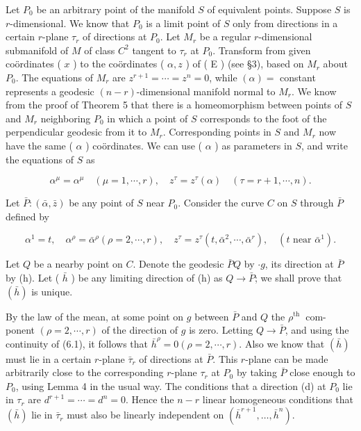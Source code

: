 \documentclass[10pt]{article}
\begin{document}
Let $P_{0}$ be an arbitrary point of the manifold $S$ of equivalent points. Suppose $S$ is $r$-dimensional. We know that $P_{0}$ is a limit point of $S$ only from directions in a certain $r$-plane $\tau_{r}$ of directions at $P_{0}$. Let $M_{r}$ be a regular $r$-dimensional submanifold of $M$ of class $C^{2}$ tangent to $\tau_{r}$ at $P_{0}$. Transform from given coördinates ( $x$ ) to the coördinates ( $\alpha, z$ ) of ( E ) (see §3), based on $M_{r}$ about $P_{0}$. The equations of $M_{r}$ are $z^{r+1}=\cdots=z^{n}=0$, while $(\alpha)=$ constant represents a geodesic $(n-r)$-dimensional manifold normal to $M_{r}$. We know from the proof of Theorem 5 that there is a homeomorphism between points of $S$ and $M_{r}$ neighboring $P_{0}$ in which a point of $S$ corresponds to the foot of the perpendicular geodesic from it to $M_{r}$. Corresponding points in $S$ and $M_{r}$ now have the same ( $\alpha$ ) coördinates. We can use ( $\alpha$ ) as parameters in $S$, and write the equations of $S$ as

$$
\alpha^{\mu}=\alpha^{\mu} \quad(\mu=1, \cdots, r), \quad z^{\tau}=z^{\tau}(\alpha) \quad(\tau=r+1, \cdots, n) .
$$

Let $\bar{P}:(\bar{\alpha}, \bar{z})$ be any point of $S$ near $P_{0}$. Consider the curve $C$ on $S$ through $\bar{P}$ defined by

$$
\alpha^{1}=t, \quad \alpha^{\rho}=\bar{\alpha}^{\rho}(\rho=2, \cdots, r), \quad z^{\tau}=z^{\tau}\left(t, \bar{\alpha}^{2}, \cdots, \bar{\alpha}^{r}\right), \quad\left(t \text { near } \bar{\alpha}^{1}\right) .
$$

Let $Q$ be a nearby point on $C$. Denote the geodesic $\bar{P} Q$ by $\cdot g$, its direction at $\bar{P}$ by (h). Let ( $\bar{h}$ ) be any limiting direction of (h) as $Q \rightarrow \bar{P}$; we shall prove that $(\bar{h})$ is unique.

By the law of the mean, at some point on $g$ between $\bar{P}$ and $Q$ the $\rho^{\text {th }}$ com-\\
ponent $(\rho=2, \cdots, r)$ of the direction of $g$ is zero. Letting $Q \rightarrow \bar{P}$, and using the continuity of (6.1), it follows that $\bar{h}^{\rho}=0(\rho=2, \cdots, r)$. Also we know that $(\bar{h})$ must lie in a certain $r$-plane $\bar{\tau}_{r}$ of directions at $\bar{P}$. This $r$-plane can be made arbitrarily close to the corresponding $r$-plane $\tau_{r}$ at $P_{0}$ by taking $\bar{P}$ close enough to $P_{0}$, using Lemma 4 in the usual way. The conditions that a direction (d) at $P_{0}$ lie in $\tau_{r}$ are $d^{r+1}=\cdots=d^{n}=0$. Hence the $n-r$ linear homogeneous conditions that $(\bar{h})$ lie in $\bar{\tau}_{r}$ must also be linearly independent on $\left(\bar{h}^{r+1}, \ldots, \bar{h}^{n}\right)$.
\end{document}
